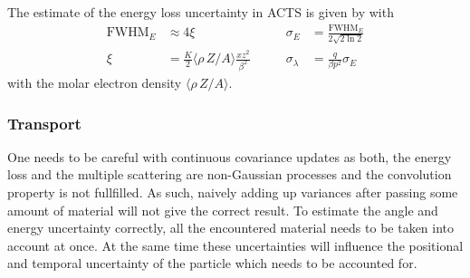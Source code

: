 The estimate of the energy loss uncertainty in ACTS is given by \textcite{pdg2024} with
\begin{equation}
\begin{aligned}
    \text{FWHM}_E &\approx 4 \xi \qquad&
    \sigma_E &= \frac{\text{FWHM}_E}{2 \sqrt{2 \ln 2}} \\
    \xi &= \frac{K}{2} \langle \rho \, Z/A \rangle \frac{x z^2}{\beta^2} \qquad&
    \sigma_\lambda &= \frac{q}{\beta p^2} \sigma_E
\end{aligned}
\end{equation}
with the molar electron density $\langle \rho \, Z/A \rangle$.

\subsubsection{Transport}

One needs to be careful with continuous covariance updates as both, the energy loss and the multiple scattering are non-Gaussian processes and the convolution property is not fullfilled. As such, naively adding up variances after passing some amount of material will not give the correct result. To estimate the angle and energy uncertainty correctly, all the encountered material needs to be taken into account at once. At the same time these uncertainties will influence the positional and temporal uncertainty of the particle which needs to be accounted for.

